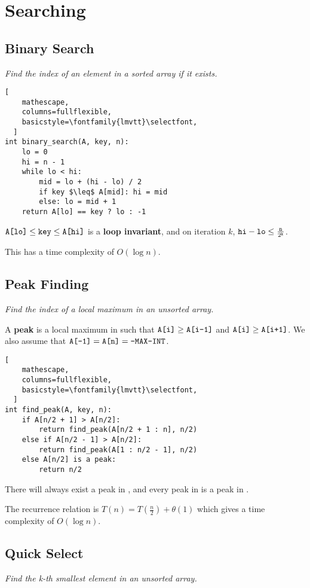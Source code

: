 \section{Searching}

\subsection{Binary Search}
\emph{Find the index of an element in a sorted array if it exists.}

\begin{lstlisting}[
    mathescape,
    columns=fullflexible,
    basicstyle=\fontfamily{lmvtt}\selectfont,
  ]
int binary_search(A, key, n):
    lo = 0
    hi = n - 1
    while lo < hi:
        mid = lo + (hi - lo) / 2
        if key $\leq$ A[mid]: hi = mid
        else: lo = mid + 1
    return A[lo] == key ? lo : -1 
\end{lstlisting}

$\texttt{A[lo]} \leq \texttt{key} \leq \texttt{A[hi]}$ is a \textbf{loop invariant},
and on iteration $k$, $\texttt{hi} - \texttt{lo} \leq \frac{\texttt{n}}{2^{\texttt{k}}}$.

This has a time complexity of $O(\log n)$.

\subsection{Peak Finding}
\emph{Find the index of a local maximum in an unsorted array.}

A \textbf{peak} is a local maximum in  such that $\texttt{A[i]} \geq \texttt{A[i-1]}$ and $\texttt{A[i]} \geq \texttt{A[i+1]}$.
We also assume that $\texttt{A[-1]} = \texttt{A[n]} = \texttt{-MAX-INT}$.

\begin{lstlisting}[
    mathescape,
    columns=fullflexible,
    basicstyle=\fontfamily{lmvtt}\selectfont,
  ]
int find_peak(A, key, n):
    if A[n/2 + 1] > A[n/2]:
        return find_peak(A[n/2 + 1 : n], n/2)
    else if A[n/2 - 1] > A[n/2]:
        return find_peak(A[1 : n/2 - 1], n/2)
    else A[n/2] is a peak:
        return n/2
\end{lstlisting}

There will always exist a peak in , and every peak in  is a peak in .

The recurrence relation is $T(n) = T(\frac{n}{2}) + \theta(1)$ which gives a time complexity of $O(\log n)$.

\subsection{Quick Select}
\emph{Find the k-th smallest element in an unsorted array.}

